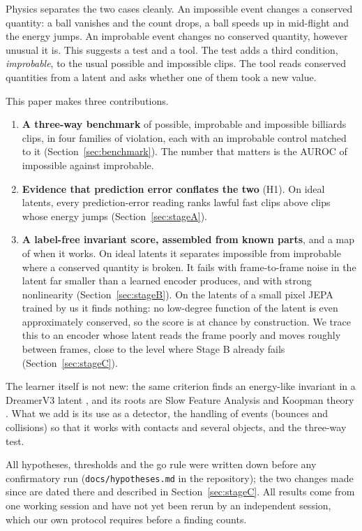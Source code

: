 \documentclass[11pt]{article}
\begin{document}
Physics separates the two cases cleanly. An impossible event changes a conserved quantity: a ball
vanishes and the count drops, a ball speeds up in mid-flight and the energy jumps. An improbable
event changes no conserved quantity, however unusual it is. This suggests a test and a tool. The
test adds a third condition, \emph{improbable}, to the usual possible and impossible clips. The
tool reads conserved quantities from a latent and asks whether one of them took a new value.

This paper makes three contributions.
\begin{enumerate}
\item \textbf{A three-way benchmark} of possible, improbable and impossible billiards clips, in
  four families of violation, each with an improbable control matched to it
  (Section~\ref{sec:benchmark}). The number that matters is the AUROC of impossible against
  improbable.
\item \textbf{Evidence that prediction error conflates the two} (H1). On ideal latents, every
  prediction-error reading ranks lawful fast clips above clips whose energy jumps
  (Section~\ref{sec:stageA}).
\item \textbf{A label-free invariant score, assembled from known parts}, and a map of when it
  works. On ideal latents it separates impossible from improbable where a conserved quantity is
  broken. It fails with frame-to-frame noise in the latent far smaller than a learned encoder
  produces, and with strong nonlinearity (Section~\ref{sec:stageB}). On the latents of a small
  pixel JEPA trained by us it finds nothing: no low-degree function of the latent is even
  approximately conserved, so the score is at chance by construction. We trace this to an encoder
  whose latent reads the frame poorly and moves roughly between frames, close to the level where Stage B
  already fails (Section~\ref{sec:stageC}).
\end{enumerate}
The learner itself is not new: the same criterion finds an energy-like invariant in a DreamerV3
latent \citep{bao2026invariant}, and its roots are Slow Feature Analysis \citep{wiskott2002sfa} and
Koopman theory \citep{kaiser2018conservation}. What we add is its use as a detector, the handling
of events (bounces and collisions) so that it works with contacts and several objects, and the
three-way test.

All hypotheses, thresholds and the go rule were written down before any confirmatory run
(\texttt{docs/hypotheses.md} in the repository); the two changes made since are dated there and
described in Section~\ref{sec:stageC}. All results come from one working session and have not yet
been rerun by an independent session, which our own protocol requires before a finding counts.
\end{document}
